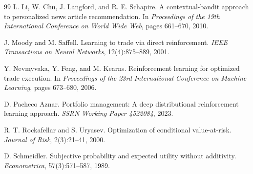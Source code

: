 \documentclass[10pt,twocolumn]{article}
\begin{document}
\begin{thebibliography}{99}
L. Li, W. Chu, J. Langford, and R. E. Schapire.
\newblock A contextual-bandit approach to personalized news article recommendation.
\newblock In \emph{Proceedings of the 19th International Conference on World Wide Web},
  pages 661--670, 2010.


J. Moody and M. Saffell.
\newblock Learning to trade via direct reinforcement.
\newblock \emph{IEEE Transactions on Neural Networks}, 12(4):875--889, 2001.


Y. Nevmyvaka, Y. Feng, and M. Kearns.
\newblock Reinforcement learning for optimized trade execution.
\newblock In \emph{Proceedings of the 23rd International Conference on Machine
  Learning}, pages 673--680, 2006.


D. Pacheco Aznar.
\newblock Portfolio management: A deep distributional reinforcement learning
  approach.
\newblock \emph{SSRN Working Paper 4522084}, 2023.


R. T. Rockafellar and S. Uryasev.
\newblock Optimization of conditional value-at-risk.
\newblock \emph{Journal of Risk}, 2(3):21--41, 2000.


D. Schmeidler.
\newblock Subjective probability and expected utility without additivity.
\newblock \emph{Econometrica}, 57(3):571--587, 1989.


\end{thebibliography}
\end{document}

